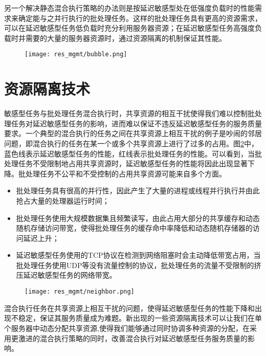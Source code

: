 另一个解决静态混合执行策略的办法则是按延迟敏感型处在低强度负载时的性能需求来确定能与之并行执行的批处理任务。这样的批处理任务具有更高的资源需求，可以在延迟敏感型任务低负载时充分利用服务器资源；在延迟敏感型任务高强度负载时并需要的大量的服务器资源时，通过资源隔离的机制保证其性能。
\begin{figure}[!t]
  \centering
    \texttt{[image: res\_mgmt/bubble.png]}
    \label{fig:bubble}    
\end{figure}
\section{资源隔离技术}
敏感型任务与批处理任务混合执行时，共享资源的相互干扰使得我们难以控制批处理任务对延迟敏感型任务的影响，进而难以保证不违反延迟敏感型任务的服务质量要求。一个典型的混合执行的任务之间在共享资源上相互干扰的例子是吵闹的邻居问题\cite{verboven2013black}，即混合执行的任务在某一个或多个共享资源上进行了过多的占用。图\ref{fig:neigbor}中，蓝色线表示延迟敏感型任务的性能，红线表示批处理任务的性能。可以看到，当批处理任务不受限制地占用共享资源时，延迟敏感型任务的性能将因此出现显著下降。批处理任务不公平和不受控制的占用共享资源可能来自多个方面。

\begin{itemize}
  \item 批处理任务具有很高的并行性，因此产生了大量的进程或线程并行执行并由此抢占大量的处理器运行时间；
  \item 批处理任务使用大规模数据集且频繁读写，由此占用大部分的共享缓存和动态随机存储访问带宽，使得批处理任务的缓存命中率降低和动态随机存储器的访问延迟上升；
  \item 延迟敏感型任务使用的TCP协议在检测到网络阻塞时会主动降低带宽占用，当批处理任务使用UDP等没有流量控制的协议，批处理任务的流量不受限制的挤压延迟敏感型任务的网络带宽。
\end{itemize}

\begin{figure}
  \centering
    \centering
    \texttt{[image: res\_mgmt/neighbor.png]}
    \label{fig:neigbor}  
\end{figure}


混合执行任务在共享资源上相互干扰的问题，使得延迟敏感型任务的性能下降和出现不稳定，保证其服务质量成为难题。新出现的一些资源隔离技术可以让我们在单个服务器中动态分配共享资源,使得我们能够通过同时协调多种资源的分配，在采用更激进的混合执行策略的同时，改善混合执行对延迟敏感型任务服务质量的影响。


